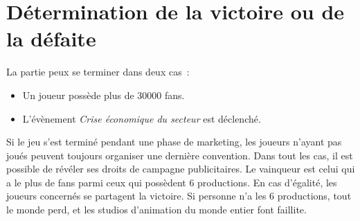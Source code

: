         \section{Détermination de la victoire ou de la défaite}

            La partie peux se terminer dans deux cas :
            \begin{itemize}
                \item Un joueur possède plus de 30000 fans.
                \item L'évènement \textit{Crise économique du secteur} est déclenché.
            \end{itemize}

            Si le jeu s'est terminé pendant une phase de marketing, les joueurs n'ayant pas joués peuvent toujours organiser une dernière convention.
            Dans tout les cas, il est possible de révéler ses droits de campagne publicitaires.\newline
            Le vainqueur est celui qui a le plus de fans parmi ceux qui possèdent 6 productions.
            En cas d'égalité, les joueurs concernés se partagent la victoire. Si personne n'a les 6 productions,
            tout le monde perd, et les studios d'animation du monde entier font faillite.
